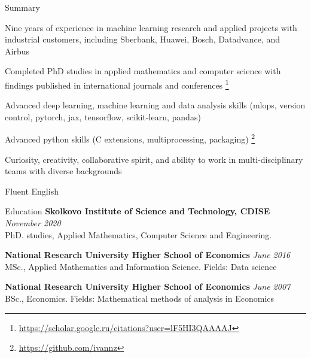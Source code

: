 \documentclass{resume} %
\begin{document}
\bigskip
\begin{rSection}{Summary}
    \item Nine years of experience in machine learning research and applied projects with industrial customers, including {Sberbank, Huawei, Bosch, Datadvance, and Airbus}


    \item Completed PhD studies in applied mathematics and computer science with findings published in international journals and conferences%
    \footnote{
        \url{https://scholar.google.ru/citations?user=lF5HI3QAAAAJ}
    }

    \item Advanced deep learning, machine learning and data analysis skills (mlops, version control, pytorch, jax, tensorflow, scikit-learn, pandas)

    \item Advanced python skills (C extensions, multiprocessing, packaging)%
    \footnote{
        \url{https://github.com/ivannz}
    }

    \item Curiosity, creativity, collaborative spirit, and ability to work in multi-disciplinary teams with diverse backgrounds

    \item Fluent English

\end{rSection}

\begin{rSection}{Education}
\textbf{Skolkovo Institute of Science and Technology, CDISE} \hfill \emph{November 2020} \\
PhD. studies, Applied Mathematics, Computer Science and Engineering.

\medskip
\textbf{National Research University Higher School of Economics} \hfill \emph{June 2016} \\
MSc., Applied Mathematics and Information Science. %
Fields: Data science

\medskip
\textbf{National Research University Higher School of Economics} \hfill \emph{June 2007} \\ 
BSc., Economics. %
Fields: Mathematical methods of analysis in Economics \\
\end{rSection}
\end{document}
